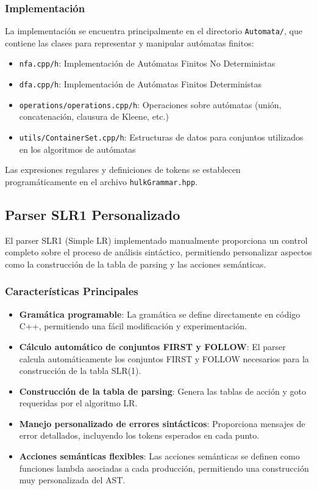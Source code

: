 \documentclass{article}
\begin{document}
\subsubsection{Implementación}
La implementación se encuentra principalmente en el directorio \texttt{Automata/}, que contiene las clases para representar y manipular autómatas finitos:
\begin{itemize}
    \item \texttt{nfa.cpp/h}: Implementación de Autómatas Finitos No Deterministas
    \item \texttt{dfa.cpp/h}: Implementación de Autómatas Finitos Deterministas
    \item \texttt{operations/operations.cpp/h}: Operaciones sobre autómatas (unión, concatenación, clausura de Kleene, etc.)
    \item \texttt{utils/ContainerSet.cpp/h}: Estructuras de datos para conjuntos utilizados en los algoritmos de autómatas
\end{itemize}

Las expresiones regulares y definiciones de tokens se establecen programáticamente en el archivo \texttt{hulkGrammar.hpp}.

\subsection{Parser SLR1 Personalizado}

El parser SLR1 (Simple LR) implementado manualmente proporciona un control completo sobre el proceso de análisis sintáctico, permitiendo personalizar aspectos como la construcción de la tabla de parsing y las acciones semánticas.

\subsubsection{Características Principales}
\begin{itemize}
    \item \textbf{Gramática programable}: La gramática se define directamente en código C++, permitiendo una fácil modificación y experimentación.
    \item \textbf{Cálculo automático de conjuntos FIRST y FOLLOW}: El parser calcula automáticamente los conjuntos FIRST y FOLLOW necesarios para la construcción de la tabla SLR(1).
    \item \textbf{Construcción de la tabla de parsing}: Genera las tablas de acción y goto requeridas por el algoritmo LR.
    \item \textbf{Manejo personalizado de errores sintácticos}: Proporciona mensajes de error detallados, incluyendo los tokens esperados en cada punto.
    \item \textbf{Acciones semánticas flexibles}: Las acciones semánticas se definen como funciones lambda asociadas a cada producción, permitiendo una construcción muy personalizada del AST.
\end{itemize}
\end{document}

